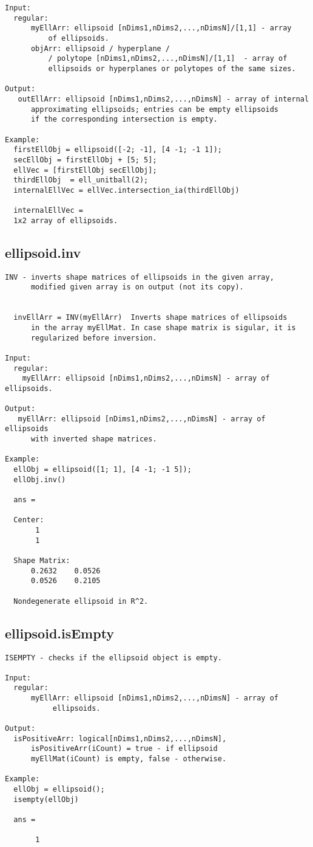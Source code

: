 \begin{verbatim}
Input:
  regular:
      myEllArr: ellipsoid [nDims1,nDims2,...,nDimsN]/[1,1] - array
          of ellipsoids.
      objArr: ellipsoid / hyperplane /
          / polytope [nDims1,nDims2,...,nDimsN]/[1,1]  - array of
          ellipsoids or hyperplanes or polytopes of the same sizes.

Output:
   outEllArr: ellipsoid [nDims1,nDims2,...,nDimsN] - array of internal
      approximating ellipsoids; entries can be empty ellipsoids
      if the corresponding intersection is empty.

Example:
  firstEllObj = ellipsoid([-2; -1], [4 -1; -1 1]);
  secEllObj = firstEllObj + [5; 5];
  ellVec = [firstEllObj secEllObj];
  thirdEllObj  = ell_unitball(2);
  internalEllVec = ellVec.intersection_ia(thirdEllObj)

  internalEllVec =
  1x2 array of ellipsoids.
\end{verbatim}
\subsection{\texorpdfstring{ellipsoid.inv}{inv}}\label{method:ellipsoid.inv}
\begin{verbatim}
INV - inverts shape matrices of ellipsoids in the given array,
      modified given array is on output (not its copy).


  invEllArr = INV(myEllArr)  Inverts shape matrices of ellipsoids
      in the array myEllMat. In case shape matrix is sigular, it is
      regularized before inversion.

Input:
  regular:
    myEllArr: ellipsoid [nDims1,nDims2,...,nDimsN] - array of ellipsoids.

Output:
   myEllArr: ellipsoid [nDims1,nDims2,...,nDimsN] - array of ellipsoids
      with inverted shape matrices.

Example:
  ellObj = ellipsoid([1; 1], [4 -1; -1 5]);
  ellObj.inv()

  ans =

  Center:
       1
       1

  Shape Matrix:
      0.2632    0.0526
      0.0526    0.2105

  Nondegenerate ellipsoid in R^2.
\end{verbatim}
\subsection{\texorpdfstring{ellipsoid.isEmpty}{isEmpty}}\label{method:ellipsoid.isEmpty}
\begin{verbatim}
ISEMPTY - checks if the ellipsoid object is empty.

Input:
  regular:
      myEllArr: ellipsoid [nDims1,nDims2,...,nDimsN] - array of
           ellipsoids.

Output:
  isPositiveArr: logical[nDims1,nDims2,...,nDimsN],
      isPositiveArr(iCount) = true - if ellipsoid
      myEllMat(iCount) is empty, false - otherwise.

Example:
  ellObj = ellipsoid();
  isempty(ellObj)

  ans =

       1
\end{verbatim}
